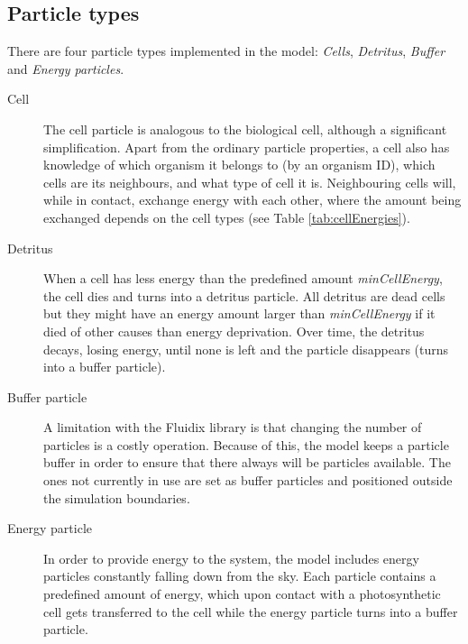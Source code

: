 \subsection{Particle types} \label{subsec:particleTypes}
There are four particle types implemented in the model: \emph{Cells}, \emph{Detritus}, \emph{Buffer} and \emph{Energy particles}.
\begin{description}
    \item [Cell] The cell particle is analogous to the biological cell, although a significant simplification. Apart from the ordinary particle properties, a cell also has knowledge of which organism it belongs to (by an organism ID), which cells are its neighbours, and what type of cell it is. Neighbouring cells will, while in contact, exchange energy with each other, where the amount being exchanged depends on the cell types (see Table \ref{tab:cellEnergies}).
    \item [Detritus] When a cell has less energy than the predefined amount \emph{minCellEnergy}, the cell dies and turns into a detritus particle. All detritus are dead cells but they might have an energy amount larger than \emph{minCellEnergy} if it died of other causes than energy deprivation. Over time, the detritus decays, losing energy, until none is left and the particle disappears (turns into a buffer particle).
    \item [Buffer particle] A limitation with the Fluidix library is that changing the number of particles is a costly operation. Because of this, the model keeps a particle buffer in order to ensure that there always will be particles available. The ones not currently in use are set as buffer particles and positioned outside the simulation boundaries. 
    \item [Energy particle] In order to provide energy to the system, the model includes energy particles constantly falling down from the sky. Each particle contains a predefined amount of energy, which upon contact with a photosynthetic cell gets transferred to the cell while the energy particle turns into a buffer particle.
\end{description}
